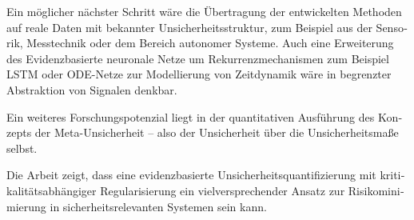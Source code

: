 \begin{otherlanguage}{ngerman}
Ein möglicher nächster Schritt wäre die Übertragung der entwickelten Methoden auf reale Daten mit bekannter Unsicherheitsstruktur, zum Beispiel aus der Sensorik, Messtechnik oder dem Bereich autonomer Systeme. 
Auch eine Erweiterung des \gls{Evidenzbasierte neuronale Netze} um Rekurrenzmechanismen zum Beispiel LSTM oder ODE-Netze zur Modellierung von Zeitdynamik wäre in begrenzter Abstraktion von Signalen denkbar.

Ein weiteres Forschungspotenzial liegt in der quantitativen Ausführung des Konzepts der Meta-Unsicherheit – also der Unsicherheit über die Unsicherheitsmaße selbst. 

Die Arbeit zeigt, dass eine evidenzbasierte Unsicherheitsquantifizierung mit kritikalitätsabhängiger Regularisierung ein vielversprechender Ansatz zur Risikominimierung in sicherheitsrelevanten Systemen sein kann.



\end{otherlanguage}